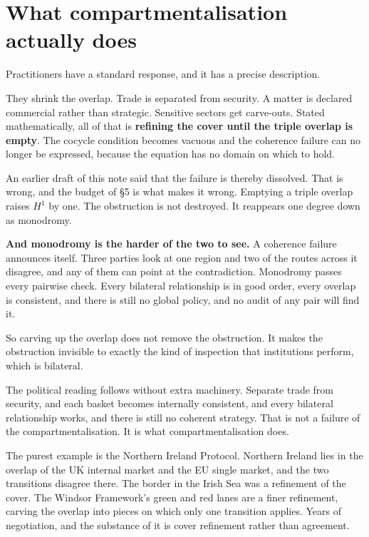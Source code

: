 \documentclass[11pt,a4paper]{article}
\begin{document}
\section{What compartmentalisation actually does}

Practitioners have a standard response, and it has a precise description.

They shrink the overlap. Trade is separated from security. A matter is declared
commercial rather than strategic. Sensitive sectors get carve-outs. Stated
mathematically, all of that is \textbf{refining the cover until the triple overlap
is empty}. The cocycle condition becomes vacuous and the coherence failure can
no longer be expressed, because the equation has no domain on which to hold.

An earlier draft of this note said that the failure is thereby dissolved. That
is wrong, and the budget of \S5 is what makes it wrong. Emptying a triple
overlap raises $H^1$ by one. The obstruction is not destroyed. It reappears one
degree down as monodromy.

\begin{alarmbox}
\textbf{And monodromy is the harder of the two to see.} A coherence failure
announces itself. Three parties look at one region and two of the routes across
it disagree, and any of them can point at the contradiction. Monodromy passes
every pairwise check. Every bilateral relationship is in good order, every
overlap is consistent, and there is still no global policy, and no audit of any
pair will find it.

So carving up the overlap does not remove the obstruction. It makes the
obstruction invisible to exactly the kind of inspection that institutions
perform, which is bilateral.
\end{alarmbox}

The political reading follows without extra machinery. Separate trade from
security, and each basket becomes internally consistent, and every bilateral
relationship works, and there is still no coherent strategy. That is not a
failure of the compartmentalisation. It is what compartmentalisation does.

The purest example is the Northern Ireland Protocol. Northern Ireland lies in
the overlap of the UK internal market and the EU single market, and the two
transitions disagree there. The border in the Irish Sea was a refinement of the
cover. The Windsor Framework's green and red lanes are a finer refinement,
carving the overlap into pieces on which only one transition applies. Years of
negotiation, and the substance of it is cover refinement rather than agreement.
\end{document}

